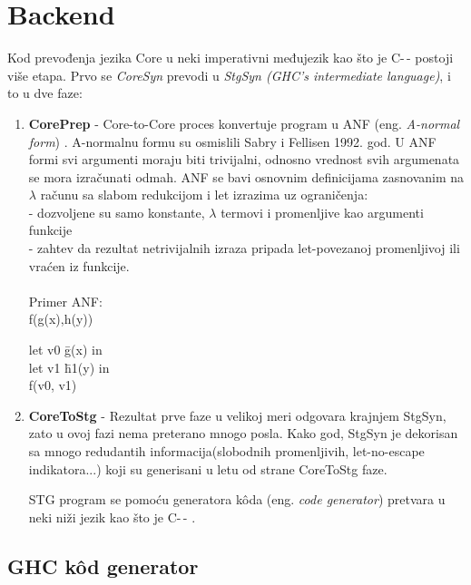 \section{Backend}
\label{sec:backend}

Kod prevođenja jezika Core u neki imperativni međujezik kao što je C-\,- postoji više etapa.
Prvo se \textit{CoreSyn} prevodi u \textit{StgSyn (GHC’s intermediate language)}, i to u dve faze:
\begin{enumerate}
	\item \textbf{CorePrep} - Core-to-Core proces konvertuje program u ANF (eng. \emph{A-normal form}) \cite{GHCxy}. A-normalnu formu su osmislili Sabry i Fellisen 1992. god.  U ANF formi svi argumenti moraju biti trivijalni, odnosno vrednost svih argumenata se mora izračunati odmah. ANF se bavi osnovnim definicijama zasnovanim na $\lambda$ računu sa slabom redukcijom i let izrazima uz ograničenja:\\
	- dozvoljene su samo konstante, $\lambda$ termovi i promenljive kao argumenti funkcije\\
	- zahtev da rezultat netrivijalnih izraza pripada let-povezanoj promenljivoj ili vraćen iz funkcije. \\ \\
	Primer ANF: \\ f(g(x),h(y))\\
	
	\begin{tabbing}
		let v0 \= g(x) in \\
		\>let v1 \= h1(y) in \\
		\> \> f(v0, v1)
	\end{tabbing}
	
	\item \textbf{CoreToStg} - Rezultat prve faze u velikoj meri odgovara krajnjem StgSyn, zato u ovoj fazi nema preterano mnogo posla. Kako god, StgSyn je dekorisan sa mnogo redudantih informacija(slobodnih promenljivih, let-no-escape indikatora...) koji su generisani u letu od strane CoreToStg faze.\cite{GHCxz}
	
	STG program se pomoću generatora k\^{o}da (eng. \emph{code generator}) pretvara u neki niži jezik kao što je C-\,- \cite{C--05}.
	
\end{enumerate}

\subsection{GHC k\^{o}d generator}
\label{sec:podnaslovGHCGenerator}

